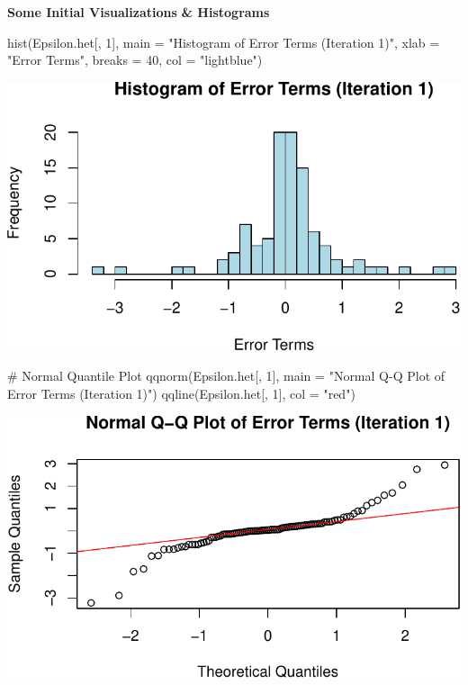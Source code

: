 \documentclass[
  11pt,
]{article}
\newenvironment{Shaded}{\begin{snugshade}}{\end{snugshade}}
\newcommand{\AttributeTok}[1]{\textcolor[rgb]{0.40,0.45,0.13}{#1}}
\newcommand{\CommentTok}[1]{\textcolor[rgb]{0.37,0.37,0.37}{#1}}
\newcommand{\DecValTok}[1]{\textcolor[rgb]{0.68,0.00,0.00}{#1}}
\newcommand{\FunctionTok}[1]{\textcolor[rgb]{0.28,0.35,0.67}{#1}}
\newcommand{\NormalTok}[1]{\textcolor[rgb]{0.00,0.23,0.31}{#1}}
\newcommand{\StringTok}[1]{\textcolor[rgb]{0.13,0.47,0.30}{#1}}
\begin{document}
\textbf{Some Initial Visualizations} \textbf{\& Histograms}

\begin{Shaded}
\begin{Highlighting}[]
\FunctionTok{hist}\NormalTok{(Epsilon.het[, }\DecValTok{1}\NormalTok{], }\AttributeTok{main =} \StringTok{"Histogram of Error Terms (Iteration 1)"}\NormalTok{, }\AttributeTok{xlab =} \StringTok{"Error Terms"}\NormalTok{, }\AttributeTok{breaks =} \DecValTok{40}\NormalTok{, }\AttributeTok{col =} \StringTok{"lightblue"}\NormalTok{)}
\end{Highlighting}
\end{Shaded}

\includegraphics{HW-4-CODE-and-ANSWERS_files/figure-pdf/unnamed-chunk-17-1.pdf}

\begin{Shaded}
\begin{Highlighting}[]
\CommentTok{\# Normal Quantile Plot}
\FunctionTok{qqnorm}\NormalTok{(Epsilon.het[, }\DecValTok{1}\NormalTok{], }\AttributeTok{main =} \StringTok{"Normal Q{-}Q Plot of Error Terms (Iteration 1)"}\NormalTok{)}
\FunctionTok{qqline}\NormalTok{(Epsilon.het[, }\DecValTok{1}\NormalTok{], }\AttributeTok{col =} \StringTok{"red"}\NormalTok{)}
\end{Highlighting}
\end{Shaded}

\includegraphics{HW-4-CODE-and-ANSWERS_files/figure-pdf/unnamed-chunk-17-2.pdf}
\end{document}
